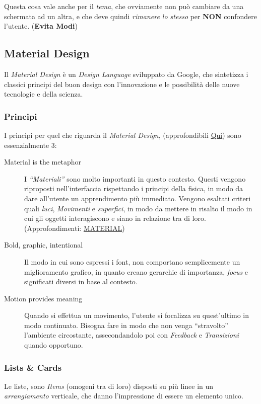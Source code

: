 \documentclass[oneside]{book}
\begin{document}
				Questa cosa vale anche per il \emph{tema}, che ovviamente non può cambiare da una schermata ad un altra, e che deve quindi \emph{rimanere lo stesso} per \textbf{NON} confondere l'utente. (\textbf{Evita Modi})

		\newpage %
		\subsection{Material Design} \label{MaterialDesign}
			Il \emph{Material Design} è un \emph{Design Language} sviluppato da Google, che sintetizza i classici principi del buon design con l'innovazione e le possibilità delle nuove tecnologie e della scienza.

			\subsubsection{Principi}
				I principi per quel che riguarda il \emph{Material Design}, (approfondibili \href{https://www.google.com/design/spec/material-design/introduction.html#}{Qui}) sono essenzialmente 3:
				\begin{description}
				\item[Material is the metaphor] I \emph{``Materiali''} sono molto importanti in questo contesto. Questi vengono riproposti nell'interfaccia rispettando i principi della fisica, in modo da dare all'utente un apprendimento più immediato. Vengono esaltati criteri quali \emph{luci}, \emph{Movimenti} e \emph{superfici}, in modo da mettere in risalto il modo in cui gli oggetti interagiscono e siano in relazione tra di loro. (Approfondimenti: \href{https://www.google.com/design/spec/what-is-material/elevation-shadows.html#}{MATERIAL})
				\item[Bold, graphic, intentional] Il modo in cui sono espressi i font, non comportano semplicemente un miglioramento grafico, in quanto creano gerarchie di importanza, \emph{focus} e significati diversi in base al contesto. 
				\item[Motion provides meaning] Quando si effettua un movimento, l'utente si focalizza su quest'ultimo in modo continuato. Bisogna fare in modo che non venga ``stravolto'' l'ambiente circostante, assecondandolo poi con \emph{Feedback} e \emph{Transizioni} quando opportuno.
				\end{description} 

			\subsubsection{Lists \& Cards} \label{sez:listsCardsAndroid}
				Le liste, sono \emph{Items} (omogeni tra di loro) disposti su più linee in un \emph{arrangiamento} verticale, che danno l'impressione di essere un elemento unico. \\
\end{document}
